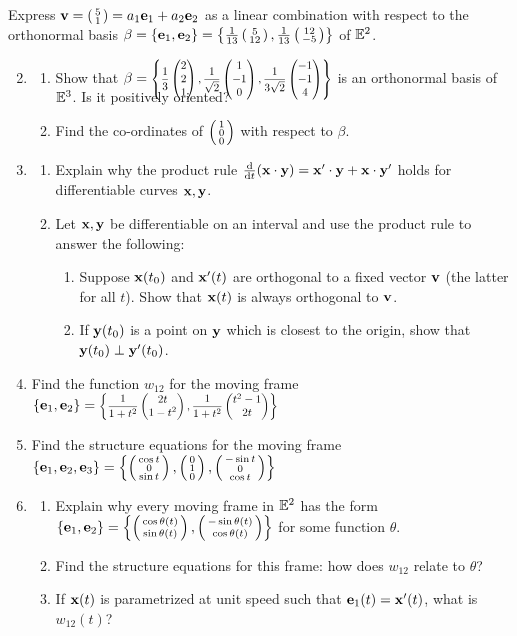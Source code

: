 \begin{exercises}
	\exstart Express ${\mathbf{v}}=\left(\begin{smallmatrix}5\\1\end{smallmatrix}\right)=a_1{\mathbf{e}}_1+a_2{\mathbf{e}}_2$ as a linear combination with respect to the orthonormal basis $\beta =\{{\mathbf{e}}_1,{\mathbf{e}}_2\} =\left\{\frac 1{13}\left(\begin{smallmatrix}5\\12\end{smallmatrix}\right),\frac 1{13}\left(\begin{smallmatrix}12\\-5\end{smallmatrix}\right)\right\}$ of $\mathbb{E}^2$.

	\begin{enumerate}\setcounter{enumi}{1}
	  \item\begin{enumerate}
	    \item Show that $\beta=\smash[b]{\scalebox{0.8}{$\left\{\dfrac 13\threevec 221,\dfrac 1{\sqrt 2}\threevec 1{-1}0,\dfrac 1{3\sqrt 2}\threevec{-1}{-1}4\right\}$}}$ is an orthonormal basis of $\mathbb{E}^3$. Is it positively oriented?
	    \item Find the co-ordinates of $\smash[t]{\left(\begin{smallmatrix}1\\0\\0\end{smallmatrix}\right)}$ with respect to $\beta$.
	  \end{enumerate}
	  
	  
	  \item\begin{enumerate}
			\item Explain why the product rule $\frac{\mathrm{d} }{\mathrm{d} t}({\mathbf{x}}\cdot{\mathbf{y}})={\mathbf{x}}'\cdot{\mathbf{y}}+{\mathbf{x}}\cdot{\mathbf{y}}'$ holds for differentiable curves ${\mathbf{x}},{\mathbf{y}}$.    
			\item Let ${\mathbf{x}},{\mathbf{y}}$ be differentiable on an interval and use the product rule to answer the following:
			\begin{enumerate}
			  \item Suppose ${\mathbf{x}}(t_0)$ and ${\mathbf{x}}'(t)$ are orthogonal to a fixed vector ${\mathbf{v}}$ (the latter for all $t$). Show that ${\mathbf{x}}(t)$ is always orthogonal to ${\mathbf{v}}$.
				\item If ${\mathbf{y}}(t_0)$ is a point on ${\mathbf{y}}$ which is closest to the origin, show that ${\mathbf{y}}(t_0)\perp{\mathbf{y}}'(t_0)$.
			\end{enumerate}
		\end{enumerate}
	  
	  
	  \item Find the function $w_{12}$ for the moving frame $\{\ve_1,\ve_2\}=\scalebox{0.8}{$\left\{\dfrac 1{1+t^2}\twovec{2t}{1-t^2},\dfrac 1{1+t^2}\twovec{t^2-1}{2t}\right\}$}$
	  
	  
	 	\item Find the structure equations for the moving frame $\{{\mathbf{e}}_1,{\mathbf{e}}_2,{\mathbf{e}}_3\} =\left\{\left(\begin{smallmatrix}\cos t\\0\\\sin t\end{smallmatrix}\right), \left(\begin{smallmatrix}0\\1\\0\end{smallmatrix}\right), \left(\begin{smallmatrix}-\sin t\\0\\\cos t\end{smallmatrix}\right)\right\}$
	  
	  
	  \item\begin{enumerate}
	    \item Explain why every moving frame in $\mathbb{E}^2$ has the form $\{{\mathbf{e}}_1,{\mathbf{e}}_2\} =\left\{\left(\begin{smallmatrix}\cos \theta(t)\\\sin \theta(t)\end{smallmatrix}\right),\left(\begin{smallmatrix}-\sin\theta(t)\\\cos \theta(t)\end{smallmatrix}\right)\right\}$ for some function $\theta$.
	    \item Find the structure equations for this frame: how does $w_{12}$ relate to $\theta$?
	    \item\label{exs:frenet2deasy} If ${\mathbf{x}}(t)$ is parametrized at unit speed such that ${\mathbf{e}}_1(t)={\mathbf{x}}'(t)$, what is $w_{12}(t)$?
	  \end{enumerate}
	  

\end{enumerate}
\end{exercises}
